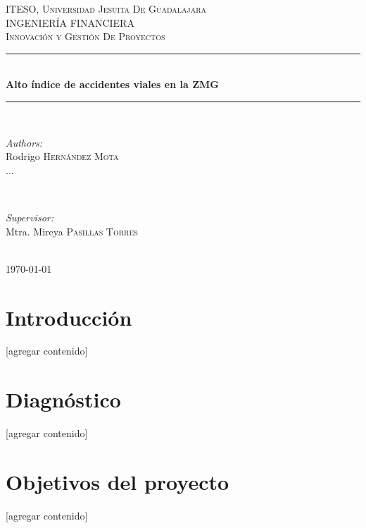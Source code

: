 \documentclass{article}
\begin{document}
\begin{titlepage}
\newcommand{\HRule}{\rule{\linewidth}{0.5mm}}

\center
\textsc{\LARGE ITESO, Universidad Jesuita De Guadalajara}\\[2cm]
\textsc{\Large INGENIERÍA FINANCIERA}\\[1cm]
\textsc{\large Innovación y Gestión De Proyectos}\\[1cm]
\HRule \\[2cm]
{ \huge \bfseries Alto índice de accidentes viales en la ZMG}\\[2cm] 
\HRule \\[2cm]
\begin{minipage}{0.4\textwidth}
\begin{flushleft} \large


\emph{Authors:}\\
Rodrigo \textsc{Hernández Mota}\\
...
\end{flushleft}
\end{minipage}
~
\begin{minipage}{0.4\textwidth}
\begin{flushright} \large
\emph{Supervisor:} \\
Mtra. Mireya \textsc{Pasillas Torres}
\end{flushright}
\end{minipage}\\[2cm]

{\large \today}\\[1cm]

\vfill
 
\end{titlepage}
\tableofcontents
\newpage

\section{Introducción} %
[agregar contenido]

\section{Diagnóstico} %
[agregar contenido]

\section{Objetivos del proyecto} %
[agregar contenido]
\end{document}
